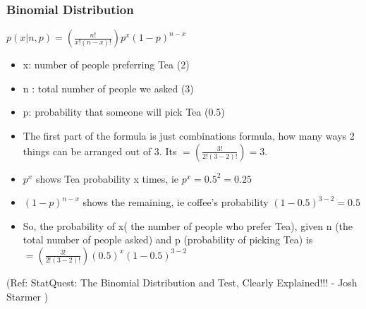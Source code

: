 \begin{frame}[fragile]\frametitle{Binomial Distribution}
$p(x|n,p) = (\frac{n!}{x!(n-x)!})p^x(1-p)^{n-x}$


	\begin{itemize}
	\item x: number of people preferring Tea (2)
	\item n : total number of people we asked (3)
	\item p: probability that someone will pick Tea (0.5)
	\item The first part of the formula is just combinations formula, how many ways 2 things can be arranged out of 3. Its $= (\frac{3!}{2!(3-2)!})=3$.
	\item $p^x$ shows Tea probability x times, ie $p^x = 0.5^2 = 0.25$
	\item $(1-p)^{n-x}$ shows the remaining, ie coffee's probability $(1-0.5)^{3-2} = 0.5$
	\item So, the probability of x( the number of people who prefer Tea), given n (the total number of people asked) and p (probability of picking Tea) is $= (\frac{3!}{2!(3-2)!})(0.5)^x(1-0.5)^{3-2}$
	\end{itemize}

 
\tiny{(Ref: StatQuest: The Binomial Distribution and Test, Clearly Explained!!! - Josh Starmer )}
\end{frame}

